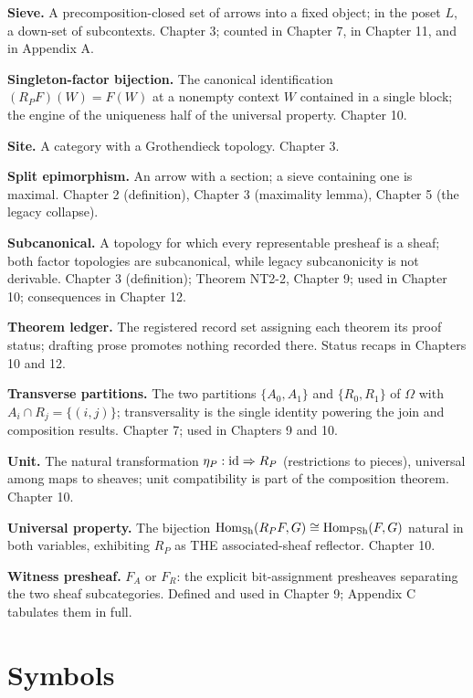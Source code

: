 \textbf{Sieve.} A precomposition-closed set of arrows into a fixed
object; in the poset $L$, a down-set of subcontexts. Chapter 3;
counted in Chapter 7, in Chapter 11, and in Appendix A.

\textbf{Singleton-factor bijection.} The canonical identification
$(R_P F)(W) = F(W)$ at a nonempty context $W$ contained in a single
block; the engine of the uniqueness half of the universal property.
Chapter 10.

\textbf{Site.} A category with a Grothendieck topology. Chapter 3.

\textbf{Split epimorphism.} An arrow with a section; a sieve
containing one is maximal. Chapter 2 (definition), Chapter 3
(maximality lemma), Chapter 5 (the legacy collapse).

\textbf{Subcanonical.} A topology for which every representable
presheaf is a sheaf; both factor topologies are subcanonical, while
legacy subcanonicity is not derivable. Chapter 3 (definition);
Theorem NT2-2, Chapter 9; used in Chapter 10; consequences in
Chapter 12.

\textbf{Theorem ledger.} The registered record set assigning each
theorem its proof status; drafting prose promotes nothing recorded
there. Status recaps in Chapters 10 and 12.

\textbf{Transverse partitions.} The two partitions
$\{A_0, A_1\}$ and $\{R_0, R_1\}$ of $\Omega$ with
$A_i \cap R_j = \{(i, j)\}$; transversality is the single identity
powering the join and composition results. Chapter 7; used in
Chapters 9 and 10.

\textbf{Unit.} The natural transformation $\eta_P : \mathrm{id} \Rightarrow
R_P$ (restrictions to pieces), universal among maps to sheaves;
unit compatibility is part of the composition theorem. Chapter 10.

\textbf{Universal property.} The bijection
$\mathrm{Hom}_{\mathrm{Sh}}(R_P F, G) \cong \mathrm{Hom}_{\mathrm{PSh}}(F, G)$ natural in both
variables, exhibiting $R_P$ as THE associated-sheaf reflector.
Chapter 10.

\textbf{Witness presheaf.} $F_A$ or $F_R$: the explicit bit-assignment
presheaves separating the two sheaf subcategories. Defined and used in
Chapter 9; Appendix C tabulates them in full.

\section{Symbols}
\label{appD:sec:symbols}

